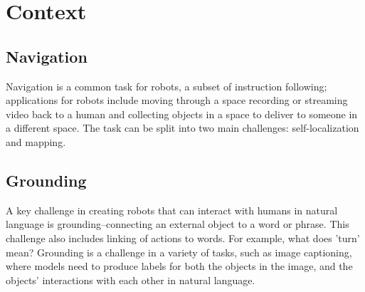 \documentclass{article}
\begin{document}


\section{Context}
\subsection{Navigation}
Navigation is a common task for robots, a subset of instruction following; applications for robots include moving through a space recording or streaming video back to a human and collecting objects in a space to deliver to someone in a different space. The task can be split into two main challenges: self-localization and mapping\cite{Wallgrun:2007zr}. 

\subsection{Grounding}
A key challenge in creating robots that can interact with humans in natural language is grounding--connecting an external object to a word or phrase. This challenge also includes linking of actions to words. For example, what does 'turn' mean? Grounding is a challenge in a variety of tasks, such as image captioning, where models need to produce labels for both the objects in the image, and the objects' interactions with each other in natural language\cite{karpathy2014captioning}.
\end{document}
